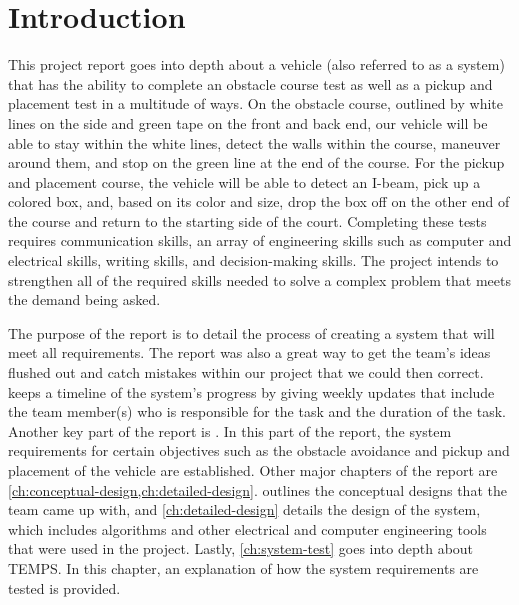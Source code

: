 \documentclass[11pt]{report}
\begin{document}
\chapter{Introduction}\label{ch:introduction}

This project report goes into depth about a vehicle (also referred to as a system) that has the ability to complete an obstacle course test as well as a pickup and placement test in a multitude of ways. On the obstacle course, outlined by white lines on the side and green tape on the front and back end, our vehicle will be able to stay within the white lines, detect the walls within the course, maneuver around them, and stop on the green line at the end of the course. For the pickup and placement course, the vehicle will be able to detect an I-beam, pick up a colored box, and, based on its color and size, drop the box off on the other end of the course and return to the starting side of the court. Completing these tests requires communication skills, an array of engineering skills such as computer and electrical skills, writing skills, and decision-making skills. The project intends to strengthen all of the required skills needed to solve a complex problem that meets the demand being asked.
\par The purpose of the report is to detail the process of creating a system that will meet all requirements. The report was also a great way to get the team’s ideas flushed out and catch mistakes within our project that we could then correct.  keeps a timeline of the system’s progress by giving weekly updates that include the team member(s) who is responsible for the task and the duration of the task. Another key part of the report is .  In this part of the report, the system requirements for certain objectives such as the obstacle avoidance and pickup and placement of the vehicle are established. Other major chapters of the report are \cref{ch:conceptual-design,ch:detailed-design}.  outlines the conceptual designs that the team came up with, and \cref{ch:detailed-design} details the design of the system, which includes algorithms and other electrical and computer engineering tools that were used in the project. Lastly, \cref{ch:system-test} goes into depth about \gls{TEMPS}. In this chapter, an explanation of how the system requirements are tested is provided.
\end{document}
